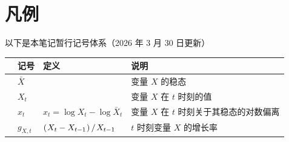 \cleardoublepage
\pagestyle{symplain}
\thispagestyle{symplain}
\chapter*{凡\hspace{1em}例}
\vspace{\baselineskip}

以下是本笔记暂行记号体系（2026 年 3 月 30 日更新）

\begin{table}[htbp]
    \centering
    \renewcommand{\arraystretch}{1.4}
    \begin{tabular}{>{\arraybackslash}p{} >{\arraybackslash}p{} >{\arraybackslash}p{} >{\arraybackslash}p{}}
        \toprule
        & \textbf{记号} & \textbf{定义} & \textbf{说明} \\
        \midrule
        &\(\bar X\) & & 变量 \(X\) 的稳态\\
        &\(X_t\) & & 变量 \(X\) 在 \(t\) 时刻的值\\
        &\(\hat x_t\) & \(\hat x_t=\log X_t-\log \bar X_t\) & 变量 \(X\) 在 \(t\) 时刻关于其稳态的对数偏离\\
        \midrule
        &\(g_{X,t}\) & \(\bka{X_t-X\lt}/\,X\lt\) & \(t\) 时刻变量 \(X\) 的增长率\\
        \bottomrule
    \end{tabular}
    \renewcommand{\arraystretch}{0}
\end{table}


\clearpage
\pagestyle{symplain}
